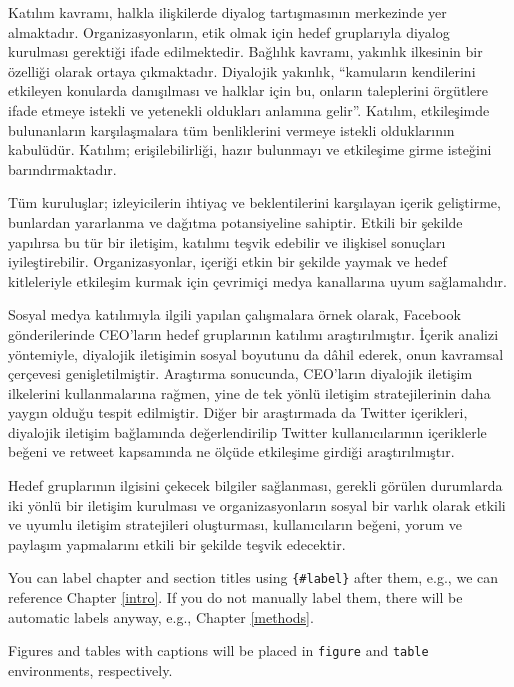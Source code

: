 \documentclass[
]{book}
\begin{document}
Katılım kavramı, halkla ilişkilerde diyalog tartışmasının merkezinde yer almaktadır. Organizasyonların, etik olmak için hedef gruplarıyla diyalog kurulması gerektiği ifade edilmektedir. Bağlılık kavramı, yakınlık ilkesinin bir özelliği olarak ortaya çıkmaktadır. \citep{kent2002toward} Diyalojik yakınlık, ``kamuların kendilerini etkileyen konularda danışılması ve halklar için bu, onların taleplerini örgütlere ifade etmeye istekli ve yetenekli oldukları anlamına gelir''. Katılım, etkileşimde bulunanların karşılaşmalara tüm benliklerini vermeye istekli olduklarının kabulüdür. Katılım; erişilebilirliği, hazır bulunmayı ve etkileşime girme isteğini barındırmaktadır. \citep{taylor2014dialogic}

Tüm kuruluşlar; izleyicilerin ihtiyaç ve beklentilerini karşılayan içerik geliştirme, bunlardan yararlanma ve dağıtma potansiyeline sahiptir. Etkili bir şekilde yapılırsa bu tür bir iletişim, katılımı teşvik edebilir ve ilişkisel sonuçları iyileştirebilir. \citep{mersey2010engagement} Organizasyonlar, içeriği etkin bir şekilde yaymak ve hedef kitleleriyle etkileşim kurmak için çevrimiçi medya kanallarına uyum sağlamalıdır.

Sosyal medya katılımıyla ilgili yapılan çalışmalara örnek olarak, Facebook gönderilerinde CEO'ların hedef gruplarının katılımı araştırılmıştır. İçerik analizi yöntemiyle, diyalojik iletişimin sosyal boyutunu da dâhil ederek, onun kavramsal çerçevesi genişletilmiştir. Araştırma sonucunda, CEO'ların diyalojik iletişim ilkelerini kullanmalarına rağmen, yine de tek yönlü iletişim stratejilerinin daha yaygın olduğu tespit edilmiştir. \citep{men2018social} Diğer bir araştırmada da Twitter içerikleri, diyalojik iletişim bağlamında değerlendirilip Twitter kullanıcılarının içeriklerle beğeni ve retweet kapsamında ne ölçüde etkileşime girdiği araştırılmıştır. \citep{wang2020dialogic}

Hedef gruplarının ilgisini çekecek bilgiler sağlanması, gerekli görülen durumlarda iki yönlü bir iletişim kurulması ve organizasyonların sosyal bir varlık olarak etkili ve uyumlu iletişim stratejileri oluşturması, kullanıcıların beğeni, yorum ve paylaşım yapmalarını etkili bir şekilde teşvik edecektir.

You can label chapter and section titles using \texttt{\{\#label\}} after them, e.g., we can reference Chapter \ref{intro}. If you do not manually label them, there will be automatic labels anyway, e.g., Chapter \ref{methods}.

Figures and tables with captions will be placed in \texttt{figure} and \texttt{table} environments, respectively.
\end{document}
